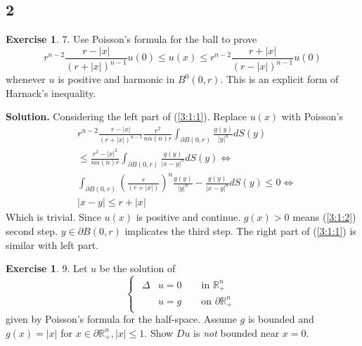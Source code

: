 \documentclass[a4paper]{book}
\newenvironment{solution}%
{\noindent\textbf{Solution.}}%
{\qedhere}
\numberwithin{equation}{chapter}
\theoremstyle{definition}
\newtheorem{exc}[exm]{Exercise}
\begin{document}
\begin{multicols}{2}
\setlength{\columnseprule}{0.2pt}  

\section{2}

\begin{exc}
	7. Use Poisson's formula for the ball to prove 
	\begin{equation}\label{3:1:1}
		r^{n-2} \frac{r-|x|}{(r+|x|)^{n-1}} u(0) \leq u(x) \leq r^{n-2} \frac{r+|x|}{(r-|x|)^{n-1}} u(0)
	\end{equation}
	whenever $ u $ is positive and harmonic in $ B^0(0,r) $. This is an explicit form of Harnack's inequality.
\end{exc}

\begin{solution}
	Considering the left part of (\ref{3:1:1}). Replace $ u(x) $ with Poisson's
	\begin{equation}\label{3:1:2}
		\begin{aligned}
		&r^{n-2} \frac{r-|x|}{(r+|x|)^{n-1}} \frac{r^2}{n \alpha (n) r} \int_{\partial B(0,r)} \frac{g(y)}{|y|^n} dS(y) \\ 
		&\leq \frac{r^2 - |x|^2}{n \alpha (n) r} \int_{\partial B(0,r)} \frac{g(y)}{|x-y|^n} dS(y) \Longleftrightarrow \\
		&\int_{\partial B(0,r)} (\frac{r}{(r+|x|)})^n \frac{g(y)}{|y|^n} - \frac{g(y)}{|x-y|^n}  dS(y) \leq 0  \Longleftrightarrow \\
		&|x-y| \leq r + |x|
		\end{aligned}
	\end{equation}
	Which is trivial. Since $ u(x) $ is positive and continue. $ g(x) > 0 $ means (\ref{3:1:2}) second step.  $ y \in \partial B(0,r) $ implicates the third step.
	The right part of (\ref{3:1:1}) is similar with left part.
\end{solution}

\begin{exc}
	9. Let $ u $ be the solution of 
	\begin{equation}\label{3:2:1}
	\begin{cases}
	\begin{aligned}
		\Delta &u = 0 \qquad \text{in } \mathbb{R}_+^n  \\
		&u = g \qquad \text{on } \partial \mathbb{R}_+^n
	\end{aligned}
	\end{cases}
	\end{equation}
	given by Poisson's formula for the half-space. Assume $ g $ is bounded and $ g(x) = |x| $ for $ x \in \partial \mathbb{R}_+^n , |x| \leq 1 $. Show $ Du $ is \textit{not} bounded near $ x = 0 $.
\end{exc}


\end{multicols}
\end{document}
